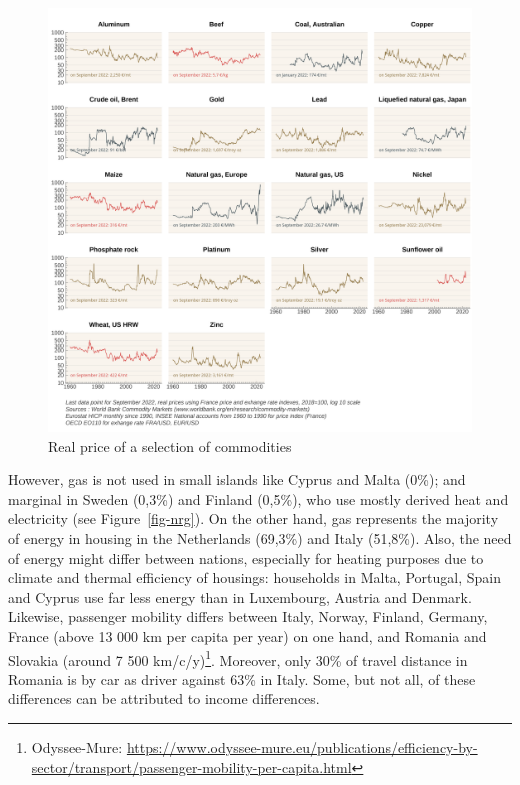 \documentclass[
  9pt,
  a4paper,
  numbers=noendperiod,
  DIV=12]{scrartcl}
\begin{document}
\begin{figure}[htb]

\caption{\label{fig-com}Real price of a selection of commodities}

{\centering \includegraphics[width=1\textwidth,height=\textheight]{SIWU_brief_files/figure-pdf/fig-com-1.png}

}

\end{figure}

However, gas is not used in small islands like Cyprus and Malta (0\%);
and marginal in Sweden (0,3\%) and Finland (0,5\%), who use mostly
derived heat and electricity (see Figure~\ref{fig-nrg}). On the other
hand, gas represents the majority of energy in housing in the
Netherlands (69,3\%) and Italy (51,8\%). Also, the need of energy might
differ between nations, especially for heating purposes due to climate
and thermal efficiency of housings: households in Malta, Portugal, Spain
and Cyprus use far less energy than in Luxembourg, Austria and Denmark.
Likewise, passenger mobility differs between Italy, Norway, Finland,
Germany, France (above 13 000 km per capita per year) on one hand, and
Romania and Slovakia (around 7 500 km/c/y)\footnote{Odyssee-Mure:
  \url{https://www.odyssee-mure.eu/publications/efficiency-by-sector/transport/passenger-mobility-per-capita.html}}.
Moreover, only 30\% of travel distance in Romania is by car as driver
against 63\% in Italy. Some, but not all, of these differences can be
attributed to income differences.
\end{document}
